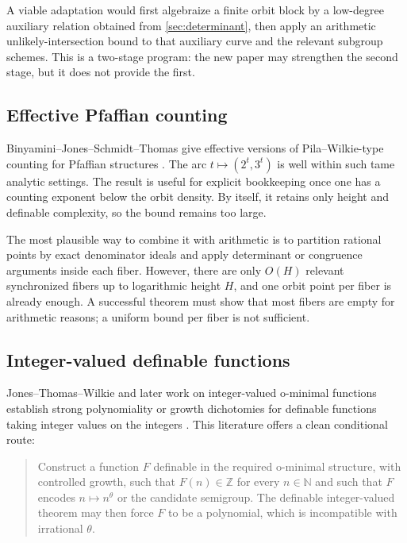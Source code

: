 \documentclass[10pt,letterpaper]{article}
\newcommand{\Z}{\mathbb Z}
\newcommand{\N}{\mathbb N}
\begin{document}
A viable adaptation would first algebraize a finite orbit block by a low-degree auxiliary
relation obtained from \cref{sec:determinant}, then apply an arithmetic
unlikely-intersection bound to that auxiliary curve and the relevant subgroup schemes.  This
is a two-stage program: the new paper may strengthen the second stage, but it does not
provide the first.

\subsection{Effective Pfaffian counting}

Binyamini--Jones--Schmidt--Thomas give effective versions of Pila--Wilkie-type counting for
Pfaffian structures \cite{BinyaminiJonesSchmidtThomas}.  The arc \(t\mapsto(2^t,3^t)\) is
well within such tame analytic settings.  The result is useful for explicit bookkeeping once
one has a counting exponent below the orbit density.  By itself, it retains only height and
definable complexity, so the bound remains too large.

The most plausible way to combine it with arithmetic is to partition rational points by
exact denominator ideals and apply determinant or congruence arguments inside each fiber.
However, there are only \(O(H)\) relevant synchronized fibers up to logarithmic height \(H\),
and one orbit point per fiber is already enough.  A successful theorem must show that most
fibers are empty for arithmetic reasons; a uniform bound per fiber is not sufficient.

\subsection{Integer-valued definable functions}

Jones--Thomas--Wilkie and later work on integer-valued o-minimal functions establish strong
polynomiality or growth dichotomies for definable functions taking integer values on the
integers \cite{JonesThomasWilkie,BhardwajEtAl}.  This literature offers a clean conditional
route:

\begin{quote}
Construct a function \(F\) definable in the required o-minimal structure, with controlled
growth, such that \(F(n)\in\Z\) for every \(n\in\N\) and such that \(F\) encodes
\(n\mapsto n^\theta\) or the candidate semigroup.  The definable integer-valued theorem may
then force \(F\) to be a polynomial, which is incompatible with irrational \(\theta\).
\end{quote}
\end{document}
